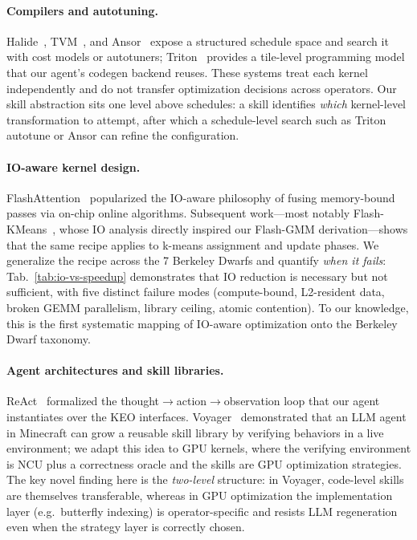 \documentclass[sigconf,nonacm]{acmart}
\begin{document}
\paragraph{Compilers and autotuning.}
Halide~\cite{ragan2013halide}, TVM~\cite{chen2018tvm}, and
Ansor~\cite{zheng2020ansor} expose a structured schedule space and
search it with cost models or autotuners; Triton~\cite{tillet2019triton}
provides a tile-level programming model that our agent's codegen
backend reuses. These systems treat each kernel independently and do
not transfer optimization decisions across operators. Our skill
abstraction sits one level above schedules: a skill identifies
\emph{which} kernel-level transformation to attempt, after which a
schedule-level search such as Triton autotune or Ansor can refine the
configuration.

\paragraph{IO-aware kernel design.}
FlashAttention~\cite{dao2022flashattention} popularized the IO-aware
philosophy of fusing memory-bound passes via on-chip online algorithms.
Subsequent work---most notably Flash-KMeans~\cite{flashkmeans2026},
whose IO analysis directly inspired our Flash-GMM derivation---shows
that the same recipe applies to k-means assignment and update phases.
We generalize the recipe across the 7 Berkeley Dwarfs and quantify
\emph{when it fails}: Tab.~\ref{tab:io-vs-speedup} demonstrates that
IO reduction is necessary but not sufficient, with five
distinct failure modes (compute-bound, L2-resident data, broken GEMM
parallelism, library ceiling, atomic contention). To our knowledge,
this is the first systematic mapping of IO-aware optimization onto the
Berkeley Dwarf taxonomy.

\paragraph{Agent architectures and skill libraries.}
ReAct~\cite{yao2023react} formalized the
thought$\to$action$\to$observation loop that our agent instantiates
over the KEO interfaces. Voyager~\cite{wang2024voyager} demonstrated
that an LLM agent in Minecraft can grow a reusable skill library by
verifying behaviors in a live environment; we adapt this idea to GPU
kernels, where the verifying environment is NCU plus a correctness
oracle and the skills are GPU optimization strategies. The key novel
finding here is the \emph{two-level} structure: in Voyager, code-level
skills are themselves transferable, whereas in GPU optimization the
implementation layer (e.g.\ butterfly indexing) is operator-specific
and resists LLM regeneration even when the strategy layer is
correctly chosen.
\end{document}
